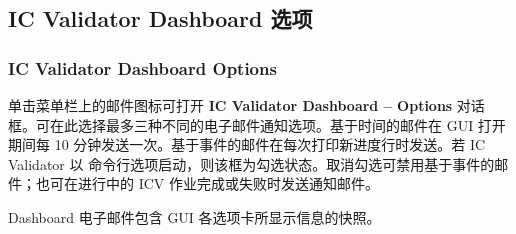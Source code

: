 
\subsection{IC Validator Dashboard 选项}
\subsubsection*{IC Validator Dashboard Options}

单击菜单栏上的邮件图标可打开 \textbf{IC Validator Dashboard -- Options} 对话框。可在此选择最多三种不同的电子邮件通知选项。基于时间的邮件在 GUI 打开期间每 10 分钟发送一次。基于事件的邮件在每次打印新进度行时发送。若 IC Validator 以  命令行选项启动，则该框为勾选状态。取消勾选可禁用基于事件的邮件；也可在进行中的 ICV 作业完成或失败时发送通知邮件。


Dashboard 电子邮件包含 GUI 各选项卡所显示信息的快照。

